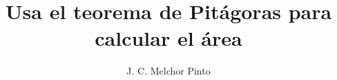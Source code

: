\documentclass[12pt]{guia}
\title{Usa el teorema de Pitágoras para calcular el área}
\author{J. C. Melchor Pinto}
\begin{document}
\pagestyle{headandfoot}
\addpoints
\INFO
\printanswers
\vspace{-0.5cm}
\begin{multicols}{2}
    
    
    
    \columnbreak
    
    
\end{multicols}
\begin{questions}
    \questionboxed[10]{}
    \questionboxed[10]{}
    \questionboxed[10]{}
    \questionboxed[10]{}
    \questionboxed[10]{}
    \questionboxed[10]{}
    \questionboxed[10]{}
    \questionboxed[10]{}
    \questionboxed[10]{}
    \questionboxed[10]{}
\end{questions}
\end{document}
